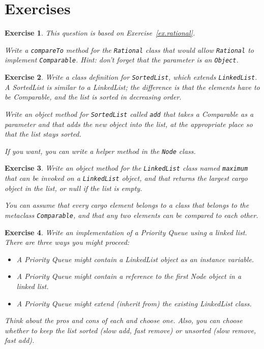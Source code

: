 \documentclass[12pt]{book}
\theoremstyle{exercise}
\newtheorem{exercise}{Exercise}[chapter]
\begin{document}
\section{Exercises}

\begin{exercise}
This question is based on Exercise~\ref{ex.rational}.

Write a {\tt compareTo} method for the {\tt Rational} class
that would allow {\tt Rational} to implement {\tt Comparable}.
Hint: don't forget that the parameter is an {\tt Object}.
\end{exercise}


\begin{exercise}
Write a class definition for {\tt SortedList}, which extends
{\tt LinkedList}.  A SortedList is similar to a LinkedList; the
difference is that the elements have to be Comparable, and the
list is sorted in decreasing order.

Write an object method for {\tt SortedList}
called {\tt add} that takes a Comparable as a parameter and that
adds the new object into the list,
at the appropriate place so
that the list stays sorted.

If you want, you can write a helper method in the {\tt Node} class.
\end{exercise}


\begin{exercise}
Write an object method for the {\tt LinkedList} class
named {\tt maximum} that can be invoked on a
{\tt LinkedList} object, and that returns the largest cargo
object in the list, or null if the list is empty.

You can assume that every cargo element belongs to a class that
belongs to the metaclass {\tt Comparable}, and that any two
elements can be compared to each other.
\end{exercise}



\begin{exercise}
Write an implementation of a Priority Queue using
a linked list.  There are three ways you might proceed:

\begin{itemize}

\item A Priority Queue might contain a LinkedList object as an
instance variable.

\item A Priority Queue might contain a reference to the
first Node object in a linked list.

\item A Priority Queue might extend (inherit from) the existing
LinkedList class.

\end{itemize}
%
Think about the pros and cons of each and choose one.  Also, you
can choose whether to keep the list sorted (slow add, fast remove)
or unsorted (slow remove, fast add).
\end{exercise}
\end{document}
